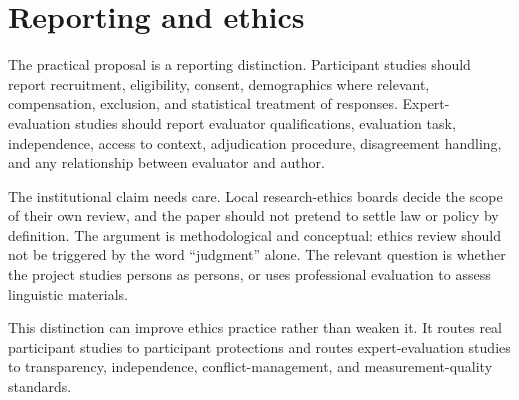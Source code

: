 \section{Reporting and ethics}
\label{sec:reporting-ethics}

The practical proposal is a reporting distinction. Participant studies should report recruitment, eligibility, consent, demographics where relevant, compensation, exclusion, and statistical treatment of responses. Expert-evaluation studies should report evaluator qualifications, evaluation task, independence, access to context, adjudication procedure, disagreement handling, and any relationship between evaluator and author.

The institutional claim needs care. Local research-ethics boards decide the scope of their own review, and the paper should not pretend to settle law or policy by definition. The argument is methodological and conceptual: ethics review should not be triggered by the word \enquote{judgment} alone. The relevant question is whether the project studies persons as persons, or uses professional evaluation to assess linguistic materials.

This distinction can improve ethics practice rather than weaken it. It routes real participant studies to participant protections and routes expert-evaluation studies to transparency, independence, conflict-management, and measurement-quality standards.
